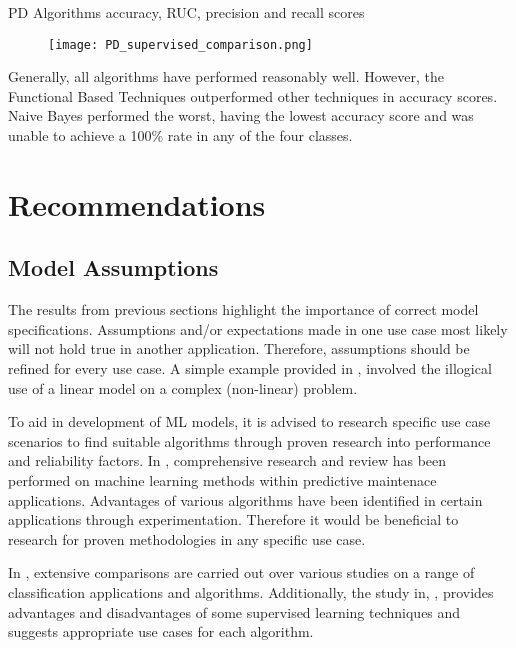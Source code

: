\bigskip
\begin{table}[h]
    \caption{PD Algorithms accuracy, RUC, precision and recall scores \cite{8300383}}
    \begin{figure}[H]
        \texttt{[image: PD\_supervised\_comparison.png]}
        \centering
    \end{figure}
    \label{fig:PD_table}
\end{table}

Generally, all algorithms have performed reasonably well. However, the Functional Based Techniques outperformed other techniques in accuracy scores. 
Naive Bayes performed the worst, having the lowest accuracy score and was unable to achieve a 100\% rate in any of the four classes.


\section{Recommendations}
\subsection{Model Assumptions}
The results from previous sections highlight the importance of correct model specifications. 
Assumptions and/or expectations made in one use case most likely will not hold true in another application.
Therefore, assumptions should be refined for every use case.
A simple example provided in \cite{saria2019tutorial}, involved the illogical use of a linear model on a complex (non-linear) problem.

To aid in development of ML models, it is advised to research specific use case scenarios to find suitable algorithms through proven research into performance and reliability factors.
In \cite{pdm_review}, comprehensive research and review has been performed on machine learning methods within predictive maintenace applications.
Advantages of various algorithms have been identified in certain applications through experimentation. 
Therefore it would be beneficial to research for proven methodologies in any specific use case.  

In \cite{10.1016/j.eswa.2017.04.003}, extensive comparisons are carried out over various studies on a range of classification applications and algorithms.
Additionally, the study in, \cite{7724478}, provides advantages and disadvantages of some supervised learning techniques and suggests appropriate use cases for each algorithm.

